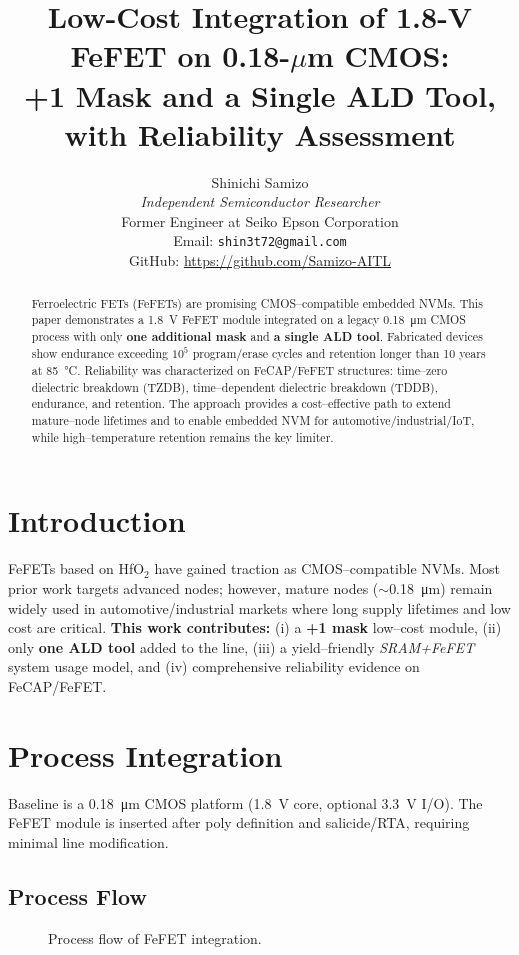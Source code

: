 \documentclass[conference]{IEEEtran}
\title{Low-Cost Integration of 1.8-V FeFET on 0.18-\(\mu\)m CMOS:\\
+1 Mask and a Single ALD Tool, with Reliability Assessment}
\author{%
Shinichi Samizo\\
\emph{Independent Semiconductor Researcher}\\
Former Engineer at Seiko Epson Corporation\\
Email: \texttt{shin3t72@gmail.com}\\
GitHub: \url{https://github.com/Samizo-AITL}
}
\begin{document}
\maketitle

\begin{abstract}
Ferroelectric FETs (FeFETs) are promising CMOS–compatible embedded NVMs. 
This paper demonstrates a \SI{1.8}{V} FeFET module integrated on a legacy \SI{0.18}{\micro m} CMOS process with only \textbf{one additional mask} and \textbf{a single ALD tool}. 
Fabricated devices show endurance exceeding \(10^{5}\) program/erase cycles and retention longer than 10 years at \SI{85}{\celsius}. 
Reliability was characterized on FeCAP/FeFET structures: time–zero dielectric breakdown (TZDB), time–dependent dielectric breakdown (TDDB), endurance, and retention. 
The approach provides a cost–effective path to extend mature–node lifetimes and to enable embedded NVM for automotive/industrial/IoT, while high–temperature retention remains the key limiter.
\end{abstract}

\section{Introduction}
FeFETs based on HfO\(_2\) have gained traction as CMOS–compatible NVMs. 
Most prior work targets advanced nodes; however, mature nodes (\(\sim\)\SI{0.18}{\micro m}) remain widely used in automotive/industrial markets where long supply lifetimes and low cost are critical.  
\textbf{This work contributes:}
(i) a \textbf{+1 mask} low–cost module,  
(ii) only \textbf{one ALD tool} added to the line,  
(iii) a yield–friendly \emph{SRAM+FeFET} system usage model, and  
(iv) comprehensive reliability evidence on FeCAP/FeFET.

\section{Process Integration}
Baseline is a \SI{0.18}{\micro m} CMOS platform (\SI{1.8}{V} core, optional \SI{3.3}{V} I/O). 
The FeFET module is inserted after poly definition and salicide/RTA, requiring minimal line modification.

\subsection{Process Flow}
\begin{figure}[t]
\centering
{}
\caption{Process flow of FeFET integration.}
\label{fig:proc_flow}
\end{figure}
\end{document}
